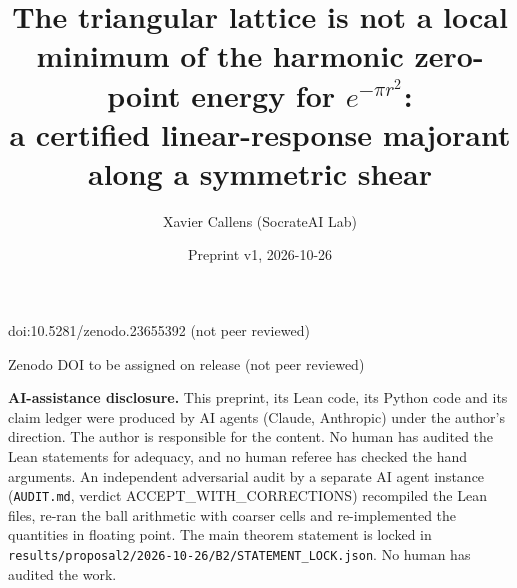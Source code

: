 \documentclass[10pt]{article}
\title{The triangular lattice is not a local minimum of the harmonic zero-point energy for $e^{-\pi r^2}$:\\
a certified linear-response majorant along a symmetric shear}
\author{Xavier Callens (SocrateAI Lab)}
\date{Preprint v1, 2026-10-26}
\begin{document}
\maketitle
\begin{center}\small doi:10.5281/zenodo.23655392 \quad (not peer reviewed)\end{center}

\begin{center}\small Zenodo DOI to be assigned on release \quad (not peer reviewed)\end{center}

\noindent\textbf{AI-assistance disclosure.} This preprint, its Lean code, its Python code and its claim ledger were
produced by AI agents (Claude, Anthropic) under the author's direction. The author is responsible for the content. No human
has audited the Lean statements for adequacy, and no human referee has checked the hand arguments. An independent adversarial audit by a separate AI agent instance (\texttt{AUDIT.md}, verdict ACCEPT\_WITH\_CORRECTIONS)
recompiled the Lean files, re-ran the ball arithmetic with coarser cells and re-implemented the quantities in
floating point. The main theorem statement is locked in \texttt{results/proposal2/2026-10-26/B2/STATEMENT\_LOCK.json}. No human
has audited the work.
\end{document}
